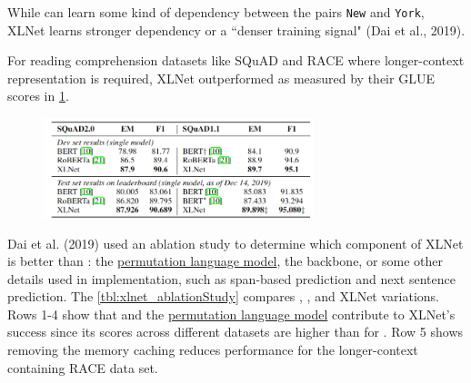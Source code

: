 While  can learn some kind of dependency between the pairs \texttt{New} and \texttt{York}, XLNet learns stronger dependency or a ``denser training signal" (Dai et al., 2019). 

For reading comprehension datasets like SQuAD and RACE where longer-context representation is required, XLNet outperformed  as measured by their GLUE scores in \cref{tbl:xlnet_generalResults}.


\begin{figure}[h]
\vspace{-5pt}
\centering
\includegraphics[width=0.7\textwidth]{imgs/xlnet_tableGeneralResults.png}
\vspace{-5pt}
\vspace{-5pt}
\label{tbl:xlnet_generalResults}
\end{figure}


Dai et al. (2019) used an ablation study to determine which component of XLNet is better than :  the \hyperref[sec:permutationLM]{permutation language model}, the  backbone, or some other details used in implementation, such as span-based prediction and next sentence prediction. The \cref{tbl:xlnet_ablationStudy} compares , , and XLNet variations. Rows 1-4 show that  and the \hyperref[sec:permutationLM]{permutation language model} contribute to XLNet's success since its scores across different datasets are higher than for . Row 5 shows removing the memory caching reduces performance for the longer-context containing RACE data set. 


